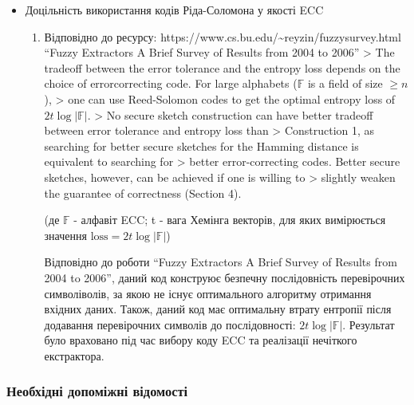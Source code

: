 \documentclass[11pt]{article}
\providecommand{\tightlist}{%
      \setlength{\itemsep}{0pt}\setlength{\parskip}{0pt}}
\begin{document}
\begin{itemize}
\tightlist
\item
  Доцільність використання кодів Ріда-Соломона у якості ECC

  \begin{enumerate}
  \def\labelenumi{\arabic{enumi}.}
  \item
    Відповідно до ресурсу:
    https://www.cs.bu.edu/\textasciitilde reyzin/fuzzysurvey.html
    ``Fuzzy Extractors A Brief Survey of Results from 2004 to 2006''
    \textgreater{} The tradeoff between the error tolerance and the
    entropy loss depends on the choice of errorcorrecting code. For
    large alphabets (\(\mathbb{F}\) is a field of size \(\geq n\)),
    \textgreater{} one can use Reed-Solomon codes to get the optimal
    entropy loss of \(2t\log{|\mathbb{F}|}\). \textgreater{} No secure
    sketch construction can have better tradeoff between error tolerance
    and entropy loss than \textgreater{} Construction 1, as searching
    for better secure sketches for the Hamming distance is equivalent to
    searching for \textgreater{} better error-correcting codes. Better
    secure sketches, however, can be achieved if one is willing to
    \textgreater{} slightly weaken the guarantee of correctness (Section
    4).

    (де \(\mathbb{F}\) - алфавіт ECC; t - вага Хемінга векторів, для
    яких вимірюється значення \(\text{loss} = 2t\log{|\mathbb{F}|}\))

    Відповідно до роботи ``Fuzzy Extractors A Brief Survey of Results
    from 2004 to 2006'', даний код конструює безпечну послідовність
    перевірочних символіволів, за якою не існує оптимального алгоритму
    отримання вхідних даних. Також, даний код має оптимальну втрату
    ентропії після додавання перевірочних символів до послідовності:
    \(2t\log{|\mathbb{F}|}\). Результат було враховано під час вибору
    коду ECC та реалізації нечіткого екстрактора.
  \end{enumerate}
\end{itemize}

    \hypertarget{ux43dux435ux43eux431ux445ux456ux434ux43dux456-ux434ux43eux43fux43eux43cux456ux436ux43dux456-ux432ux456ux434ux43eux43cux43eux441ux442ux456}{%
\subsubsection{Необхідні допоміжні
відомості}\label{ux43dux435ux43eux431ux445ux456ux434ux43dux456-ux434ux43eux43fux43eux43cux456ux436ux43dux456-ux432ux456ux434ux43eux43cux43eux441ux442ux456}}
\end{document}
